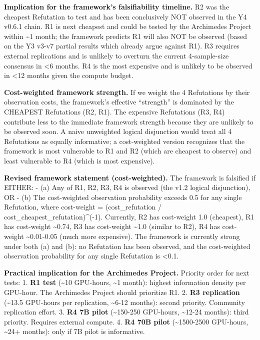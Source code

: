 \documentclass[11pt]{article}
\begin{document}
\textbf{Implication for the framework's falsifiability timeline.} R2 was
the cheapest Refutation to test and has been conclusively NOT observed
in the Y4 v0.6.1 chain. R1 is next cheapest and could be tested by the
Archimedes Project within \textasciitilde1 month; the framework predicts
R1 will also NOT be observed (based on the Y3 v3-v7 partial results
which already argue against R1). R3 requires external replications and
is unlikely to overturn the current 4-sample-size consensus in
\textless6 months. R4 is the most expensive and is unlikely to be
observed in \textless12 months given the compute budget.

\textbf{Cost-weighted framework strength.} If we weight the 4
Refutations by their observation costs, the framework's effective
``strength'' is dominated by the CHEAPEST Refutations (R2, R1). The
expensive Refutations (R3, R4) contribute less to the immediate
framework strength because they are unlikely to be observed soon. A
naive unweighted logical disjunction would treat all 4 Refutations as
equally informative; a cost-weighted version recognizes that the
framework is most vulnerable to R1 and R2 (which are cheapest to
observe) and least vulnerable to R4 (which is most expensive).

\textbf{Revised framework statement (cost-weighted).} The framework is
falsified if EITHER: - (a) Any of R1, R2, R3, R4 is observed (the v1.2
logical disjunction), OR - (b) The cost-weighted observation probability
exceeds 0.5 for any single Refutation, where cost-weight =
(cost\_refutation / cost\_cheapest\_refutation)\^{}(-1). Currently, R2
has cost-weight 1.0 (cheapest), R1 has cost-weight \textasciitilde0.74,
R3 has cost-weight \textasciitilde1.0 (similar to R2), R4 has
cost-weight \textasciitilde0.01-0.05 (much more expensive). The
framework is currently strong under both (a) and (b): no Refutation has
been observed, and the cost-weighted observation probability for any
single Refutation is \textless0.1.

\textbf{Practical implication for the Archimedes Project.} Priority
order for next tests: 1. \textbf{R1 test} (\textasciitilde10 GPU-hours,
\textasciitilde1 month): highest information density per GPU-hour. The
Archimedes Project should prioritize R1. 2. \textbf{R3 replication}
(\textasciitilde13.5 GPU-hours per replication, \textasciitilde6-12
months): second priority. Community replication effort. 3. \textbf{R4 7B
pilot} (\textasciitilde150-250 GPU-hours, \textasciitilde12-24 months):
third priority. Requires external compute. 4. \textbf{R4 70B pilot}
(\textasciitilde1500-2500 GPU-hours, \textasciitilde24+ months): only if
7B pilot is informative.
\end{document}
